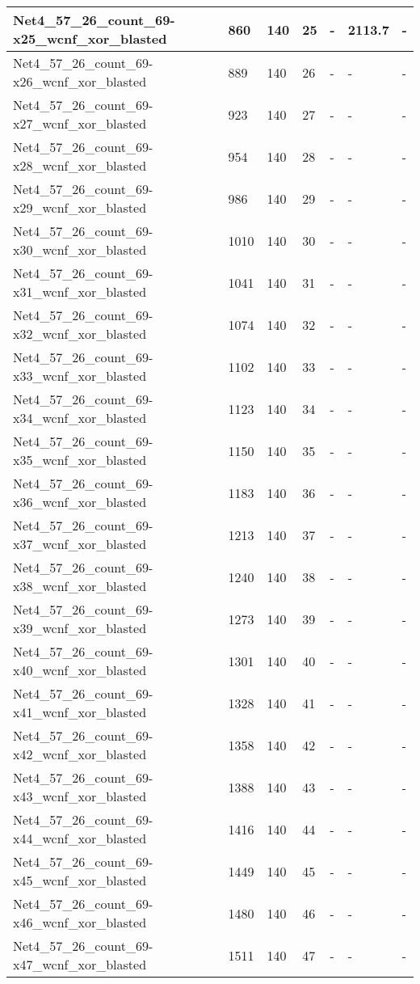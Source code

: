 \begin{scriptsize}
\begin{longtable}{|p{5cm}|l|l|l|l|l|l|}
Net4\_57\_26\_count\_69-x25\_wcnf\_xor\_blasted&860&140&25&-&2113.7&- \\ \hline 
Net4\_57\_26\_count\_69-x26\_wcnf\_xor\_blasted&889&140&26&-&-&- \\ \hline 
Net4\_57\_26\_count\_69-x27\_wcnf\_xor\_blasted&923&140&27&-&-&- \\ \hline 
Net4\_57\_26\_count\_69-x28\_wcnf\_xor\_blasted&954&140&28&-&-&- \\ \hline 
Net4\_57\_26\_count\_69-x29\_wcnf\_xor\_blasted&986&140&29&-&-&- \\ \hline 
Net4\_57\_26\_count\_69-x30\_wcnf\_xor\_blasted&1010&140&30&-&-&- \\ \hline 
Net4\_57\_26\_count\_69-x31\_wcnf\_xor\_blasted&1041&140&31&-&-&- \\ \hline 
Net4\_57\_26\_count\_69-x32\_wcnf\_xor\_blasted&1074&140&32&-&-&- \\ \hline 
Net4\_57\_26\_count\_69-x33\_wcnf\_xor\_blasted&1102&140&33&-&-&- \\ \hline 
Net4\_57\_26\_count\_69-x34\_wcnf\_xor\_blasted&1123&140&34&-&-&- \\ \hline 
Net4\_57\_26\_count\_69-x35\_wcnf\_xor\_blasted&1150&140&35&-&-&- \\ \hline 
Net4\_57\_26\_count\_69-x36\_wcnf\_xor\_blasted&1183&140&36&-&-&- \\ \hline 
Net4\_57\_26\_count\_69-x37\_wcnf\_xor\_blasted&1213&140&37&-&-&- \\ \hline 
Net4\_57\_26\_count\_69-x38\_wcnf\_xor\_blasted&1240&140&38&-&-&- \\ \hline 
Net4\_57\_26\_count\_69-x39\_wcnf\_xor\_blasted&1273&140&39&-&-&- \\ \hline 
Net4\_57\_26\_count\_69-x40\_wcnf\_xor\_blasted&1301&140&40&-&-&- \\ \hline 
Net4\_57\_26\_count\_69-x41\_wcnf\_xor\_blasted&1328&140&41&-&-&- \\ \hline 
Net4\_57\_26\_count\_69-x42\_wcnf\_xor\_blasted&1358&140&42&-&-&- \\ \hline 
Net4\_57\_26\_count\_69-x43\_wcnf\_xor\_blasted&1388&140&43&-&-&- \\ \hline 
Net4\_57\_26\_count\_69-x44\_wcnf\_xor\_blasted&1416&140&44&-&-&- \\ \hline 
Net4\_57\_26\_count\_69-x45\_wcnf\_xor\_blasted&1449&140&45&-&-&- \\ \hline 
Net4\_57\_26\_count\_69-x46\_wcnf\_xor\_blasted&1480&140&46&-&-&- \\ \hline 
Net4\_57\_26\_count\_69-x47\_wcnf\_xor\_blasted&1511&140&47&-&-&- \\ \hline 

\end{longtable}
\end{scriptsize}
